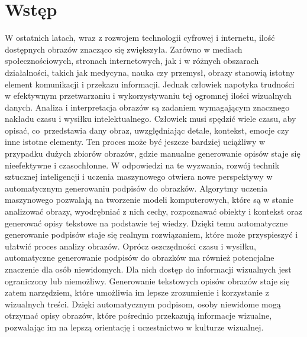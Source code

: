 \newpage %
\section{Wstęp}
W ostatnich latach, wraz z rozwojem technologii cyfrowej i internetu, ilość dostępnych obrazów znacząco się zwiększyła. Zarówno w mediach społecznościowych, stronach internetowych, jak i w różnych obszarach działalności, takich jak medycyna, nauka czy przemysł, obrazy stanowią istotny element komunikacji i przekazu informacji. Jednak człowiek napotyka trudności w efektywnym przetwarzaniu i wykorzystywaniu tej ogromnej ilości wizualnych danych. Analiza i interpretacja obrazów są zadaniem wymagającym znacznego nakładu czasu i wysiłku intelektualnego. Człowiek musi spędzić wiele czasu, aby opisać, co~przedstawia dany obraz, uwzględniając detale, kontekst, emocje czy inne istotne elementy. Ten proces może być jeszcze bardziej uciążliwy w przypadku dużych zbiorów obrazów, gdzie manualne generowanie opisów staje się nieefektywne i czasochłonne. W odpowiedzi na te wyzwania, rozwój technik sztucznej inteligencji i uczenia maszynowego otwiera nowe perspektywy w automatycznym generowaniu podpisów do obrazków. Algorytmy uczenia maszynowego pozwalają na tworzenie modeli komputerowych, które są w stanie analizować obrazy, wyodrębniać z nich cechy, rozpoznawać obiekty i kontekst oraz generować opisy tekstowe na podstawie tej wiedzy. Dzięki temu automatyczne generowanie podpisów staje się realnym rozwiązaniem, które może przyspieszyć i ułatwić proces analizy obrazów. Oprócz oszczędności czasu i wysiłku, automatyczne generowanie podpisów do obrazków ma również potencjalne znaczenie dla osób niewidomych. Dla nich dostęp do informacji wizualnych jest ograniczony lub niemożliwy. Generowanie tekstowych opisów obrazów staje się zatem narzędziem, które umożliwia im lepsze zrozumienie i korzystanie z wizualnych treści. Dzięki automatycznym podpisom, osoby niewidome mogą otrzymać opisy obrazów, które pośrednio przekazują informacje wizualne, pozwalając im na lepszą orientację i uczestnictwo w kulturze wizualnej.
